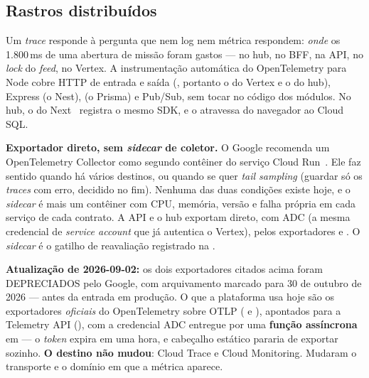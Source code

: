 \subsection{Rastros distribuídos}

Um \emph{trace} responde à pergunta que nem log nem métrica respondem:
\emph{onde} os 1.800\,ms de uma abertura de missão foram gastos --- no hub,
no BFF, na API, no \emph{lock} do \emph{feed}, no Vertex. A instrumentação
automática do OpenTelemetry para Node cobre HTTP de entrada e saída
(, portanto o  do Vertex e o do hub), Express (o Nest),
 (o Prisma) e Pub/Sub, sem tocar no código dos módulos. No hub, o
 do Next~\cite{nextjs2026} registra o mesmo SDK, e o
 atravessa do navegador ao Cloud SQL.

\begin{decisao}
\textbf{Exportador direto, sem \emph{sidecar} de coletor.} O Google
recomenda um OpenTelemetry Collector como segundo contêiner do serviço Cloud
Run~\cite{gcpotelcloudrun}. Ele faz sentido quando há vários destinos, ou
quando se quer \emph{tail sampling} (guardar só os \emph{traces} com erro,
decidido no fim). Nenhuma das duas condições existe hoje, e o \emph{sidecar}
é mais um contêiner com CPU, memória, versão e falha própria em cada
serviço de cada contrato. A API e o hub exportam direto, com ADC (a mesma
credencial de \emph{service account} que já autentica o Vertex), pelos
exportadores  e
. O \emph{sidecar} é o gatilho de
reavaliação registrado na .

\textbf{Atualização de 2026-09-02:} os dois exportadores citados acima foram
DEPRECIADOS pelo Google, com arquivamento marcado para 30 de outubro de 2026
--- antes da entrada em produção. O que a plataforma usa hoje são os
exportadores \emph{oficiais} do OpenTelemetry sobre OTLP
( e ), apontados para a
Telemetry API (), com a credencial ADC entregue
por uma \textbf{função assíncrona} em  --- o \emph{token} expira
em uma hora, e cabeçalho estático pararia de exportar sozinho. \textbf{O
destino não mudou}: Cloud Trace e Cloud Monitoring. Mudaram o transporte e o
domínio em que a métrica aparece.
\end{decisao}

